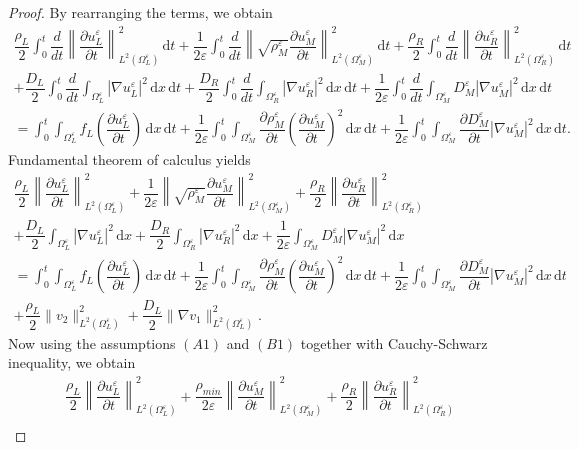 \documentclass[11pt]{article}
\def\es{\varepsilon}
\def\orr{\Omega_R^\varepsilon}
\def\omm{\Omega_M^\varepsilon}
\def\oll{\Omega_L^\varepsilon}
\newcommand{\di}[1]{\,\mathrm{d}#1}
\begin{document}
\begin{proof}
By rearranging the terms, we obtain
	\begin{multline*}
   \dfrac{\rho_L}{2}\int_0^t\dfrac{d}{dt}\left\|\dfrac{\partial u_L^\es}{\partial t} \right\|_{L^2(\oll)}^2\di{t}+   \dfrac{1}{2\es}\int_0^t\dfrac{d}{dt}\left\|\sqrt{\rho_M^\es}\dfrac{\partial u_M^\es}{\partial t} \right\|_{L^2(\omm)}^2\di{t}+  \dfrac{\rho_R}{2}\int_0^t\dfrac{d}{dt}\left\|\dfrac{\partial u_R^\es}{\partial t} \right\|_{L^2(\orr)}^2\di{t}\\
   + \dfrac{D_L}{2}\int_0^t\dfrac{d}{dt}\int_{\oll}|\nabla u_L^\es|^2\di{x}\di{t}+
   \dfrac{D_R}{2}\int_0^t\dfrac{d}{dt}\int_{\orr}|\nabla u_R^\es|^2\di{x}\di{t}
   +\dfrac{1}{2\es}\int_0^t\dfrac{d}{dt}\int_{\omm}D_M^\es |\nabla u_M^\es|^2 \di{x}\di{t}\\
     = \int_0^t\int_{\oll} f_L\left(\dfrac{\partial u_L^\es}{\partial t} \right) \di{x}\di{t}+\dfrac{1}{2\es}\int_0^t\int_{\omm}\dfrac{\partial \rho_M^{\es}}{\partial t}\left(\dfrac{\partial u_M^\es}{\partial t}\right)^2\di{x}\di{t}+\dfrac{1}{2\es}\int_0^t\int_{\omm}\dfrac{\partial D_M^\es}{\partial t} |\nabla u_M^\es|^2 \di{x}\di{t}.
\end{multline*}
Fundamental theorem of calculus yields
	\begin{multline*}
   \dfrac{\rho_L}{2}\left\|\dfrac{\partial u_L^\es}{\partial t} \right\|_{L^2(\oll)}^2+   \dfrac{1}{2\es}\left\|\sqrt{\rho_M^\es}\dfrac{\partial u_M^\es}{\partial t} \right\|_{L^2(\omm)}^2+  \dfrac{\rho_R}{2}\left\|\dfrac{\partial u_R^\es}{\partial t} \right\|_{L^2(\orr)}^2\\
   + \dfrac{D_L}{2}\int_{\oll}|\nabla u_L^\es|^2\di{x}+
   \dfrac{D_R}{2}\int_{\orr}|\nabla u_R^\es|^2\di{x}
   +\dfrac{1}{2\es}\int_{\omm}D_M^\es |\nabla u_M^\es|^2 \di{x}\\
     = \int_0^t\int_{\oll} f_L\left(\dfrac{\partial u_L^\es}{\partial t} \right) \di{x}\di{t}+\dfrac{1}{2\es}\int_0^t\int_{\omm}\dfrac{\partial \rho_M^{\es}}{\partial t}\left(\dfrac{\partial u_M^\es}{\partial t}\right)^2\di{x}\di{t}+\dfrac{1}{2\es}\int_0^t\int_{\omm}\dfrac{\partial D_M^\es}{\partial t} |\nabla u_M^\es|^2 \di{x}\di{t}\\
     +\dfrac{\rho_L}{2}\|v_2\|_{L^2(\oll)}^2+\dfrac{D_L}{2}\|\nabla v_1\|_{L^2(\oll)}^2.
\end{multline*}
Now using the assumptions $(A1)$ and $(B1)$ together with Cauchy-Schwarz inequality, we obtain
	\begin{multline*}
   \dfrac{\rho_L}{2}\left\|\dfrac{\partial u_L^\es}{\partial t} \right\|_{L^2(\oll)}^2+   \dfrac{\rho_{min}}{2\es}\left\|\dfrac{\partial u_M^\es}{\partial t} \right\|_{L^2(\omm)}^2+  \dfrac{\rho_R}{2}\left\|\dfrac{\partial u_R^\es}{\partial t} \right\|_{L^2(\orr)}^2\\

\end{multline*}
\end{proof}
\end{document}
